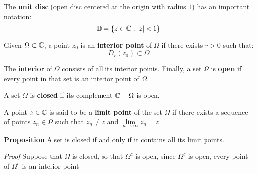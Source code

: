 The \textbf{unit disc} (open disc centered at the origin with radius $1$) has an important notation:
\[ \mathbb{D} = \left\lbrace z \in \mathbb{C} : \left| z \right|< 1 \right\rbrace \]

\begin{define}
	Given $ \Omega \subset \mathbb{C} $, a point $ z_0 $ is an \textbf{interior point} of $ \Omega $ if there exists $ r>0  $ such that:
	\[ D_r(z_0) \subset \Omega \]
\end{define}

The \textbf{interior} of $ \Omega $ consists of all its interior points. Finally, a set $ \Omega $ is \textbf{open} if every point in that set is an interior point of $ \Omega $.

A set $ \Omega $ is \textbf{closed} if its complement $ \mathbb{C} - \Omega $ is open.

\begin{define}
	A point $ z \in \mathbb{C} $ is said to be a \textbf{limit point} of the set $ \Omega $ if there exists a sequence of points $ z_n \in \Omega $ such that $ z_n \neq z $ and $ \lim\limits_{n \rightarrow \infty} z_n = z $
\end{define}

\textbf{Proposition} A set is closed if and only if it contains all its limit points.

\textit{Proof} 
Suppose that $\Omega$ is closed, so that $ \Omega^c $ is open, since $ \Omega^c $ is open, every point of $ \Omega^c $ is an interior point